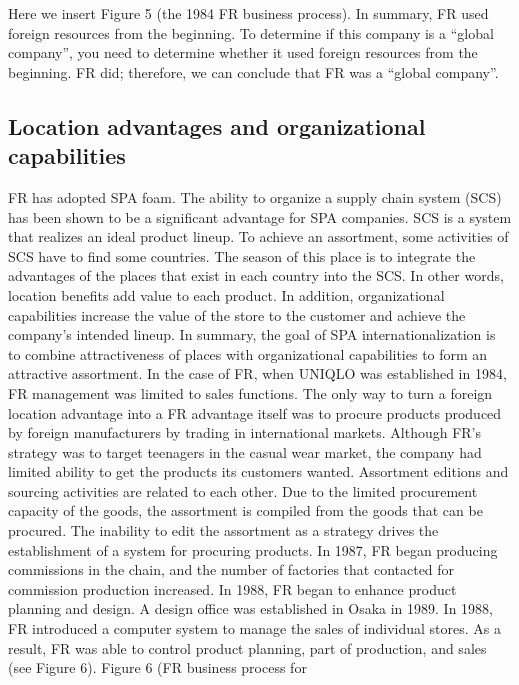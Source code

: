 \documentclass[]{article}
\begin{document}
Here we insert Figure 5 (the 1984 FR business process). In summary, FR
used foreign resources from the beginning. To determine if this company
is a ``global company'', you need to determine whether it used foreign
resources from the beginning. FR did; therefore, we can conclude that FR
was a ``global company''.

\hypertarget{location-advantages-and-organizational-capabilities}{%
\subsection{Location advantages and organizational
capabilities}\label{location-advantages-and-organizational-capabilities}}

FR has adopted SPA foam. The ability to organize a supply chain system
(SCS) has been shown to be a significant advantage for SPA companies.
SCS is a system that realizes an ideal product lineup. To achieve an
assortment, some activities of SCS have to find some countries. The
season of this place is to integrate the advantages of the places that
exist in each country into the SCS. In other words, location benefits
add value to each product. In addition, organizational capabilities
increase the value of the store to the customer and achieve the
company's intended lineup. In summary, the goal of SPA
internationalization is to combine attractiveness of places with
organizational capabilities to form an attractive assortment. In the
case of FR, when UNIQLO was established in 1984, FR management was
limited to sales functions. The only way to turn a foreign location
advantage into a FR advantage itself was to procure products produced by
foreign manufacturers by trading in international markets. Although FR's
strategy was to target teenagers in the casual wear market, the company
had limited ability to get the products its customers wanted. Assortment
editions and sourcing activities are related to each other. Due to the
limited procurement capacity of the goods, the assortment is compiled
from the goods that can be procured. The inability to edit the
assortment as a strategy drives the establishment of a system for
procuring products. In 1987, FR began producing commissions in the
chain, and the number of factories that contacted for commission
production increased. In 1988, FR began to enhance product planning and
design. A design office was established in Osaka in 1989. In 1988, FR
introduced a computer system to manage the sales of individual stores.
As a result, FR was able to control product planning, part of
production, and sales (see Figure 6). Figure 6 (FR business process for
\end{document}
